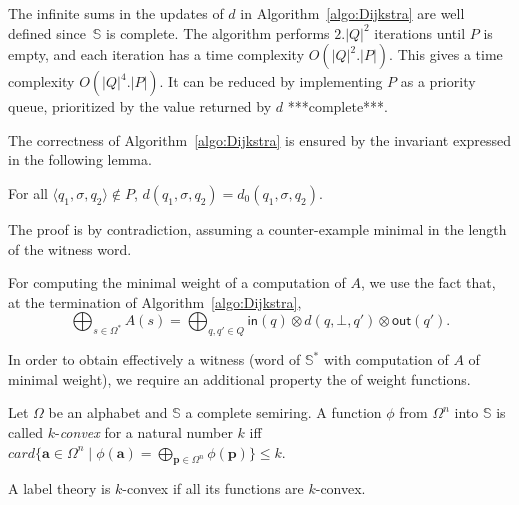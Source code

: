 \documentclass[runningheads]{llncs}
\def\<#1>{\langle #1 \rangle}
\newcommand{\Semiring}{\mathbb{S}}
\begin{document}
\noindent
The infinite sums in the updates of $d$ in Algorithm~\ref{algo:Dijkstra} are well defined
since~$\Semiring$ is complete.
The algorithm performs $2.|Q|^2$ iterations until $P$ is empty, 
and each iteration has a time complexity $O(|Q|^2 . |P|)$.
This gives a time complexity $O(|Q|^4 . |P|)$. 
It can be reduced by implementing $P$ as a priority queue, 
prioritized by the value returned by $d$
***complete***. %

The correctness of Algorithm~\ref{algo:Dijkstra} 
is ensured by the invariant expressed in the following lemma.
\begin{lemma}
For all $\< q_1, \sigma, q_2> \notin P$, $d(q_1, \sigma, q_2) =  d_0(q_1, \sigma, q_2)$.
\end{lemma}
The proof is by contradiction, 
assuming a counter-example minimal in the length of the witness word.




\noindent
For computing the minimal weight of a computation of $A$, we use the fact that,
at the termination of Algorithm~\ref{algo:Dijkstra}, %
\[
  {\displaystyle \bigoplus_{s \in \Omega^*} A(s)} = 
  {\displaystyle\bigoplus_{q, q' \in Q}} \textstyle
  \mathsf{in}(q) \mathop{\otimes} d(q, \bot, q') \mathop{\otimes} \mathsf{out}(q').
\]

\noindent
In order to obtain effectively a witness 
(word of $\Semiring^*$ with computation of $A$ of minimal weight), 
we require an additional property the of weight functions.
%
\begin{definition}
Let $\Omega$ be an alphabet and $\Semiring$ a complete semiring.
A function $\phi$ from $\Omega^n$ into $\Semiring$
is called $k$-\emph{convex} for a natural number $k$ iff 
$\mathit{card}\{ \mathbf{a} \in \Omega^n \mid \phi(\mathbf{a}) = 
                 \displaystyle\bigoplus_{\mathbf{p} \in \Omega^n} \phi(\mathbf{p}) \} \leq k$.
\end{definition}
A label theory is $k$-convex if all its functions are $k$-convex.
\end{document}

